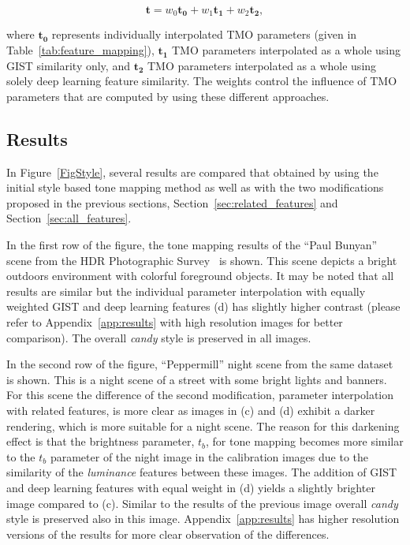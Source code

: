 \begin{equation}
   \mathbf{t} = w_0\mathbf{t_0} + w_1\mathbf{t_1} + w_2\mathbf{t_2}, 
\end{equation}

where $\mathbf{t_0}$ represents individually interpolated TMO parameters (given in Table~\ref{tab:feature_mapping}), $\mathbf{t_1}$ TMO parameters interpolated as a whole using GIST similarity only, and $\mathbf{t_2}$ TMO parameters interpolated as a whole using solely deep learning feature similarity. The weights control the influence of TMO parameters that are computed by using these different approaches.

\subsection{Results}
In Figure~\ref{FigStyle}, several results are compared that obtained by using the initial style based tone mapping method as well as with the two modifications proposed in the previous sections, Section~\ref{sec:related_features} and Section~\ref{sec:all_features}. 

In the first row of the figure, the tone mapping results of the ``Paul Bunyan'' scene from the HDR Photographic Survey~\cite{fairchild2007hdr} is shown. This scene depicts a bright outdoors environment with colorful foreground objects. It may be noted that all results are similar but the individual parameter interpolation with equally weighted GIST and deep learning features (d) has slightly higher contrast (please refer to Appendix~\ref{app:results} with high resolution images for better comparison). The overall \emph{candy} style is preserved in all images. 

In the second row of the figure, ``Peppermill'' night scene from the same dataset is shown. This is a night scene of a street with some bright lights and banners. For this scene the difference of the second modification, parameter interpolation with related features, is more clear as images in (c) and (d) exhibit a darker rendering, which is more suitable for a night scene. The reason for this darkening effect is that the brightness parameter, $t_b$, for tone mapping becomes more similar to the $t_b$ parameter of the night image in the calibration images due to the similarity of the \emph{luminance} features between these images. The addition of GIST and deep learning features with equal weight in (d) yields a slightly brighter image compared to (c). Similar to the results of the previous image overall \emph{candy} style is preserved also in this image. Appendix~\ref{app:results} has higher resolution versions of the results for more clear observation of the differences.


